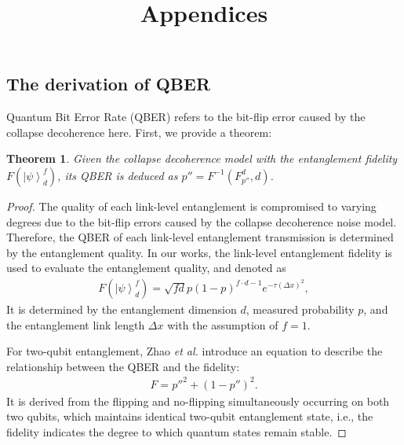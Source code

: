 \documentclass[conference]{IEEEtran}
\title{Appendices}
\newtheorem{theorem}{Theorem}
\begin{document}
\begin{appendices}
\section{The derivation of QBER}
Quantum Bit Error Rate (QBER) refers to the bit-flip error caused by the collapse decoherence here. First, we provide a theorem:
\begin{theorem}
\label{QBER}
Given the collapse decoherence model with the entanglement fidelity $F(\left| {{\psi}} \right\rangle _d^f) $, its QBER is deduced as $p'' = F^{-1}(F^d_{p''}, d)$.
\end{theorem}
\begin{proof}
The quality of each link-level entanglement is compromised to varying degrees due to the bit-flip errors caused by the collapse decoherence noise model. Therefore, the QBER of each link-level entanglement transmission is determined by the entanglement quality. In our works, the link-level entanglement fidelity is used to evaluate the entanglement quality, and denoted as
\begin{equation}
\begin{aligned}
	F(\left| {{\psi}} \right\rangle _d^f) = {\sqrt {fd}} p{(1 - p)^{f \cdot d - 1}} {e^{ - \tau {{(\Delta x)}^2}}},
\end{aligned}
\end{equation}
It is determined by the entanglement dimension $d$, measured probability $p$, and the entanglement link length $\Delta x$ with the assumption of $f=1$.

For two-qubit entanglement, Zhao \textit{et al.} \cite{zhao2022e2e} introduce an equation to describe the relationship between the QBER and the fidelity:
\begin{equation}
	\begin{aligned}
		F = p''^2 + (1-p'')^2.
	\end{aligned}
\end{equation}
It is derived from the flipping and no-flipping simultaneously occurring on both two qubits, which maintains identical two-qubit entanglement state, i.e., the fidelity indicates the degree to which quantum states remain stable.


\end{proof}
\end{appendices}
\end{document}
